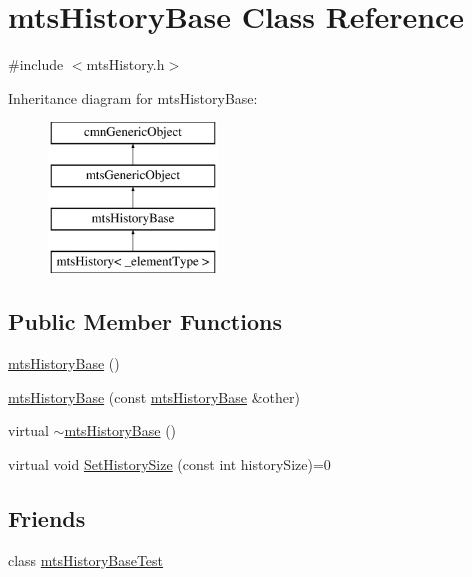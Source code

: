 \hypertarget{classmts_history_base}{\section{mts\-History\-Base Class Reference}
\label{classmts_history_base}
}


{\ttfamily \#include $<$mts\-History.\-h$>$}

Inheritance diagram for mts\-History\-Base\-:\begin{figure}[H]
\begin{center}
\leavevmode
\includegraphics[height=4.000000cm]{d3/d4e/classmts_history_base}
\end{center}
\end{figure}
\subsection*{Public Member Functions}
\begin{DoxyCompactItemize}
\item 
\hyperlink{classmts_history_base_ab1be142d2daac21c1a6971bbc0540a46}{mts\-History\-Base} ()
\item 
\hyperlink{classmts_history_base_a389cde5558d565468611d99bb524ed11}{mts\-History\-Base} (const \hyperlink{classmts_history_base}{mts\-History\-Base} \&other)
\item 
virtual \hyperlink{classmts_history_base_a85f8ab2e3e7b97d129f04753486b12d7}{$\sim$mts\-History\-Base} ()
\item 
virtual void \hyperlink{classmts_history_base_a737a74f1689e5e13806feb7f0c1f9fda}{Set\-History\-Size} (const int history\-Size)=0
\end{DoxyCompactItemize}
\subsection*{Friends}
\begin{DoxyCompactItemize}
\item 
class \hyperlink{classmts_history_base_a45c74443e3df647dafe639ff0e9e74f8}{mts\-History\-Base\-Test}
\end{DoxyCompactItemize}


